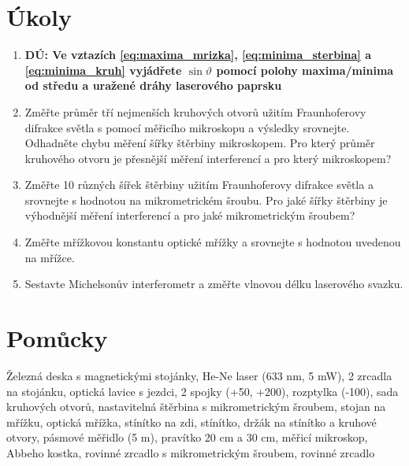 


\newcommand{\Author}{Vojtěch Fišer}
\newcommand{\Institute}{FJFI ČVUT v Praze}
\newcommand{\Subject}{Fyzikální praktika 1}
\newcommand{\Group}{2}
\newcommand{\Title}{Úloha číslo \#10 : Interference}
\newcommand{\Date}{20.4.2016}







\section{Úkoly} %
\label{sec:_koly}

  \begin{enumerate}
\item \textbf{DÚ: Ve vztazích \eqref{eq:maxima_mrizka}, \eqref{eq:minima_sterbina} a \eqref{eq:minima_kruh} vyjádřete $\sin \vartheta$ pomocí polohy maxima/minima od středu a uražené dráhy laserového paprsku}
\item Změřte průměr tří nejmenších kruhových otvorů užitím Fraunhoferovy difrakce světla s pomocí měřicího mikroskopu a výsledky srovnejte. Odhadněte chybu měření šířky štěrbiny
mikroskopem. Pro který průměr kruhového otvoru je přesnější měření interferencí a pro který mikroskopem?
\item Změřte 10 různých šířek štěrbiny užitím Fraunhoferovy difrakce světla a srovnejte s hodnotou na mikrometrickém šroubu. Pro jaké šířky štěrbiny je výhodnější měření interferencí a pro jaké mikrometrickým šroubem?
\item Změřte mřížkovou konstantu optické mřížky a srovnejte s hodnotou uvedenou na mřížce.
\item Sestavte Michelsonův interferometr a změřte vlnovou délku laserového svazku.
  \end{enumerate}

\section{Pomůcky} %
\label{sec:pom_cky}
Železná deska s magnetickými stojánky, He-Ne laser (633 nm, 5 mW), 2 zrcadla na stojánku, optická lavice s jezdci, 2 spojky (+50, +200), rozptylka (-100), sada kruhových otvorů, nastavitelná štěrbina s mikrometrickým šroubem, stojan na mřížku, optická mřížka, stínítko na zdi, stínítko, držák na stínítko a kruhové otvory, pásmové měřidlo (5 m), pravítko 20 cm a 30 cm, měřicí mikroskop, Abbeho kostka, rovinné zrcadlo s mikrometrickým šroubem, rovinné zrcadlo
